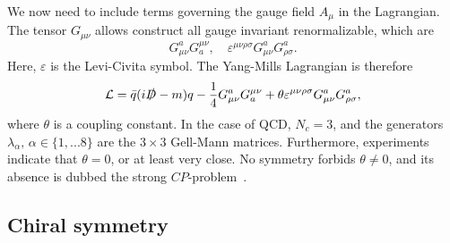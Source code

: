 We now need to include terms governing the gauge field $A_\mu$ in the Lagrangian.
The tensor $G_{\mu\nu}$ allows construct all gauge invariant renormalizable, which are
\begin{equation}
    G_{\mu \nu}^a G_a^{\mu \nu}, 
    \quad 
    \varepsilon^{\mu\nu\rho\sigma} G_{\mu \nu}^a G_{\rho \sigma}^a.
\end{equation}
%
Here, $\varepsilon$ is the Levi-Civita symbol.
The Yang-Mills Lagrangian is therefore
\begin{equation}
    \mathcal{L} = \bar q ( i \slashed{D} - m)q 
    - \frac{1}{4} G_{\mu \nu}^a G_a^{\mu \nu}
    + \theta \varepsilon^{\mu\nu\rho\sigma} G_{\mu \nu}^a G_{\rho \sigma}^a,
\end{equation}
%
where $\theta$ is a coupling constant. 
In the case of QCD, $N_c = 3$, and the generators $\lambda_\alpha, \, \alpha \in \{1, ... 8\}$ are the $3\times3$ Gell-Mann matrices.
Furthermore, experiments indicate that $\theta = 0$, or at least very close.
No symmetry forbids $\theta \neq 0$, and its absence is dubbed the strong $CP$-problem~\cite{Schwartz:QFT}.



\subsection*{Chiral symmetry}

